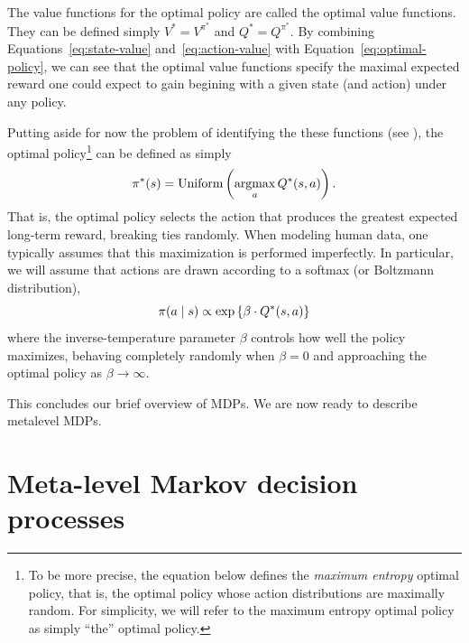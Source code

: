 The value functions for the optimal policy are called the optimal value functions. They can be defined simply $V^* = V^{\pi^*}$ and $Q^* = Q^{\pi^*}$. By combining Equations~\ref{eq:state-value} and~\ref{eq:action-value} with Equation~\ref{eq:optimal-policy}, we can see that the optimal value functions specify the maximal expected reward one could expect to gain begining with a given state (and action) under any policy.

Putting aside for now the problem of identifying the these functions (see \citealp{puterman2014markov}), the optimal policy\footnote{%
  To be more precise, the equation below defines the \emph{maximum entropy} optimal policy, that is, the optimal policy whose action distributions are maximally random. For simplicity, we will refer to the maximum entropy optimal policy as simply ``the'' optimal policy.
} can be defined as simply
%
\begin{equation}\label{eq:argmaxQ}
  \pi^*(s) = \text{Uniform}\left(\operatorname*{argmax}_a Q^*(s, a)\right).
\end{equation}
%
That is, the optimal policy selects the action that produces the greatest expected long-term reward, breaking ties randomly. When modeling human data, one typically assumes that this maximization is performed imperfectly. In particular, we will assume that actions are drawn according to a softmax (or Boltzmann distribution),
%
\begin{equation}\label{eq:softoptimal}
  \pi(a \mid s) \propto \exp\left\{\beta \cdot Q^*(s, a)\right\}
\end{equation}
%
where the inverse-temperature parameter $\beta$ controls how well the policy maximizes, behaving completely randomly when $\beta = 0$ and approaching the optimal policy as $\beta \rightarrow \infty$.

This concludes our brief overview of MDPs. We are now ready to describe metalevel MDPs.


\section{Meta-level Markov decision processes}


